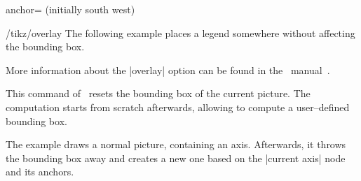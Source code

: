\begin{pgfplotskey}{anchor= (initially south west)}
\begin{minipage}
\begin{tabular}
\begin{center}
\begin{key}{/tikz/overlay}
The following example places a legend somewhere without affecting the bounding box.
\begin{codeexample}[]
\end{codeexample}

	More information about the |overlay| option can be found in the \PGF\ manual~\cite{tikz}.
\end{key}

\begin{command}{\pgfresetboundingbox}
	This command of \pgfname\ resets the bounding box of the current picture. The computation starts from scratch afterwards, allowing to compute a user--defined bounding box.
	
\begin{codeexample}[]
\setlength{\fboxsep}{0pt}%
%
\end{codeexample}%
	The example draws a normal picture, containing an axis. Afterwards, it throws the bounding box away and creates a new one based on the |current axis| node and its anchors.
\end{command}


\end{center}
\end{tabular}
\end{minipage}
\end{pgfplotskey}
